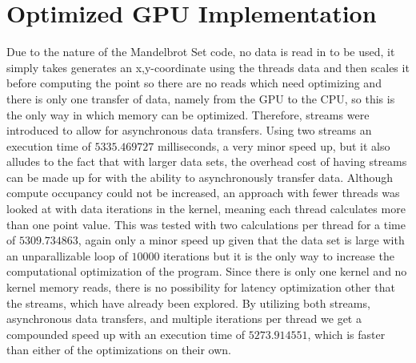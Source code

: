 \documentclass[a4paper,10pt]{article}
\begin{document}
\section{Optimized GPU Implementation}
Due to the nature of the Mandelbrot Set code, no data is read in to be used, it simply takes generates an x,y-coordinate using the threads data and then scales it before computing the point so there are no reads which need optimizing and there is only one transfer of data, namely from the GPU to the CPU, so this is the only way in which memory can be optimized. Therefore, streams were introduced to allow for asynchronous data transfers. Using two streams an execution time of $5335.469727$ milliseconds, a very minor speed up, but it also alludes to the fact that with larger data sets, the overhead cost of having streams can be made up for with the ability to asynchronously transfer data.
\linebreak
\linebreak
Although compute occupancy could not be increased, an approach with fewer threads was looked at with data iterations in the kernel, meaning each thread calculates more than one point value. This was tested with two calculations per thread for a time of $5309.734863$, again only a minor speed up given that the data set is large with an unparallizable loop of $10000$ iterations but it is the only way to increase the computational optimization of the program.
\linebreak
\linebreak
Since there is only one kernel and no kernel memory reads, there is no possibility for latency optimization other that the streams, which have already been explored.
\linebreak
\linebreak
By utilizing both streams, asynchronous data transfers, and multiple iterations per thread we get a compounded speed up with an execution time of $5273.914551$, which is faster than either of the optimizations on their own.
\end{document}
